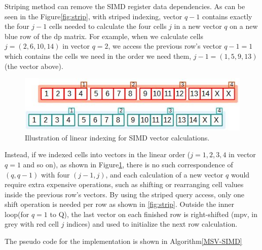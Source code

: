 Striping method can remove the SIMD register data dependencies. As can be seen in the Figure\ref{fig:strip}, with striped indexing, vector $q-1$ contains exactly the four $j-1$ cells needed to calculate the four cells $j$ in a new vector $q$ on a new blue row of the dp matrix. For example, when we calculate cells $j=(2,6,10,14)$ in vector $q=2$, we access the previous row’s vector $q-1=1$ which contains the cells we need in the order we need them, $j-1=(1,5,9,13)$ (the vector above). 

\begin{figure}[!htb]
\centering
	\includegraphics{Figures/msv_nostrip.jpg}
	\caption{Illustration of linear indexing for SIMD vector calculations.}
	\label{fig:nostrip}
\end{figure}

Instead, if we indexed cells into vectors in the linear order ($j=1,2,3,4$ in vector $q=1$ and so on), as shown in Figure\ref{fig:nostrip}, there is no such correspondence of $(q,q-1)$ with four $(j-1,j)$, and each calculation of a new vector $q$ would require extra expensive operations, such as shifting or rearranging cell values inside the previous row's vectors. By using the striped query access, only one shift operation is needed per row as shown in \ref{fig:strip}. Outside the inner loop(for $q = 1$ to Q), the last vector on each finished row is right-shifted (mpv, in grey with red cell $j$ indices) and used to initialize the next row calculation.

The pseudo code for the implementation is shown in Algorithm\ref{MSV-SIMD}

